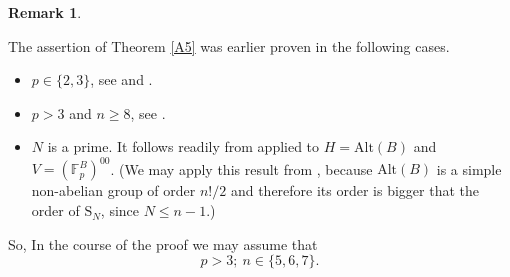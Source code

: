 \documentclass[12pt,a4paper,reqno]{amsart}
\def\F{{\mathbb F}}
\def\Alt{\mathrm{Alt}}
\theoremstyle{definition}
\newtheorem{rem}[thm]{Remark}
\begin{document}
\begin{rem}
\label{DoneN}

The assertion of Theorem \ref{A5} was earlier proven in the following cases.
\begin{itemize}
\item[(A)]
$p\in \{2,3\}$, see \cite[Ex. 7.2]{ZarhinM} and \cite[Cor. 4.3]{ZarhinCrelle}.
\item[(B)]
$p>3$ and $n \ge 8$, see \cite[Cor. 4.6]{ZarhinCrelle}.
\item[(C)]
$N$ is a prime. It follows readily from  \cite[Cor. 4.4(i)]{ZarhinCrelle} applied to $H=\mathrm{Alt}(B)$ and $V=(\F_p^{B})^{00}$.
(We may apply this result from \cite{ZarhinCrelle}, because  $\Alt(B)$ is a simple non-abelian group of order $n!/2$ and therefore its order is bigger that the order
of $\mathrm{S}_N$, since $N \le n-1$.)
\end{itemize}
 
So, In the course of the proof we may assume that 
\begin{equation}
\label{n567}
p>3; \  n\in \{5,6,7\}.
\end{equation}
\end{rem}
\end{document}

